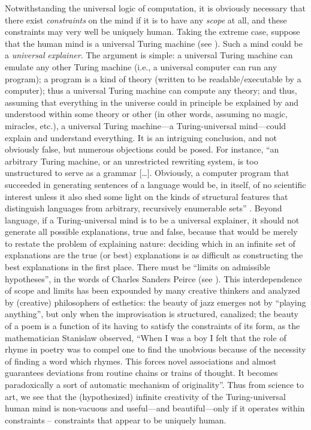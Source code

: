 \documentclass[output=paper]{langsci/langscibook}
\begin{document}
Notwithstanding the universal logic of computation, it is obviously
necessary that there exist \emph{constraints} on the mind if it is to have any
\emph{scope} at all, and these constraints may very well be uniquely human.
Taking the extreme case, suppose that the human mind is a universal Turing
machine (see \citealt{Watumull2015}). Such a mind could be a \emph{universal}
\emph{explainer}. The argument is simple: a universal Turing machine can
emulate any other Turing machine (i.e., a universal computer can run any
program); a program is a kind of theory (written to be readable/executable by a
computer); thus a universal Turing machine can compute any theory; and thus,
assuming that everything in the universe could in principle be explained by and
understood within some theory or other (in other words, assuming no magic,
miracles, etc.), a universal Turing machine—a Turing-universal mind—could
explain and understand everything. It is an intriguing conclusion, and not
obviously false, but numerous objections could be posed. For instance, “an
arbitrary Turing machine, or an unrestricted rewriting system, is too
unstructured to serve as a grammar […]. Obviously, a computer program that
succeeded in generating sentences of a language would be, in itself, of no
scientific interest unless it also shed some light on the kinds of structural
features that distinguish languages from arbitrary, recursively enumerable
sets” \citep[360]{Chomsky1963}. Beyond language, if a
Turing-universal mind is to be a universal explainer, it should not generate
all possible explanations, true and false, because that would be merely to
restate the problem of explaining nature: deciding which in an infinite set of
explanations are the true (or best) explanations is as difficult as
constructing the best explanations in the first place. There must be “limits on
admissible hypotheses”, in the words of Charles Sanders Peirce (see
\citealt{Chomsky2006}). This interdependence of scope and limits has been
expounded by many creative thinkers and analyzed by (creative) philosophers of
esthetics: the beauty of jazz emerges not by “playing anything”, but only when
the improvisation is structured, canalized; the beauty of a poem is a function
of its having to satisfy the constraints of its form, as the mathematician
Stanislaw \citet[180]{Ulam1976} observed, “When I was a boy I felt that the
role of rhyme in poetry was to compel one to find the unobvious because of the
necessity of finding a word which rhymes. This forces novel associations and
almost guarantees deviations from routine chains or trains of thought. It
becomes paradoxically a sort of automatic mechanism of originality”. Thus from
science to art, we see that the (hypothesized) infinite creativity of the
Turing-universal human mind is non-vacuous and useful—and beautiful—only if it
operates within constraints – constraints that appear to be uniquely human.
\end{document}
